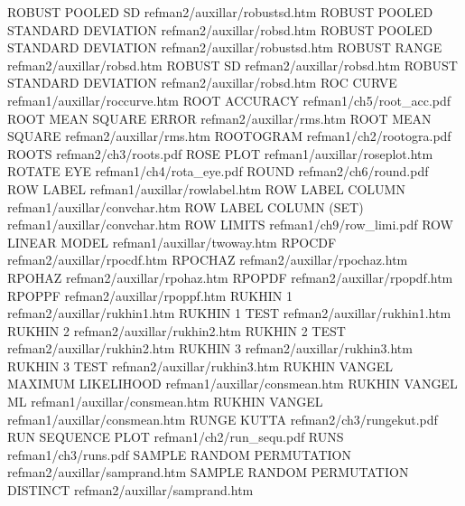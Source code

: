 ROBUST POOLED SD                        refman2/auxillar/robustsd.htm
ROBUST POOLED STANDARD DEVIATION        refman2/auxillar/robsd.htm
ROBUST POOLED STANDARD DEVIATION        refman2/auxillar/robustsd.htm
ROBUST RANGE                            refman2/auxillar/robsd.htm
ROBUST SD                               refman2/auxillar/robsd.htm
ROBUST STANDARD DEVIATION               refman2/auxillar/robsd.htm
ROC CURVE                               refman1/auxillar/roccurve.htm
ROOT ACCURACY                           refman1/ch5/root_acc.pdf
ROOT MEAN SQUARE ERROR                  refman2/auxillar/rms.htm
ROOT MEAN SQUARE                        refman2/auxillar/rms.htm
ROOTOGRAM                               refman1/ch2/rootogra.pdf
ROOTS                                   refman2/ch3/roots.pdf
ROSE PLOT                               refman1/auxillar/roseplot.htm
ROTATE EYE                              refman1/ch4/rota_eye.pdf
ROUND                                   refman2/ch6/round.pdf
ROW LABEL                               refman1/auxillar/rowlabel.htm
ROW LABEL COLUMN                        refman1/auxillar/convchar.htm
ROW LABEL COLUMN (SET)                  refman1/auxillar/convchar.htm
ROW LIMITS                              refman1/ch9/row_limi.pdf
ROW LINEAR MODEL                        refman1/auxillar/twoway.htm
RPOCDF                                  refman2/auxillar/rpocdf.htm
RPOCHAZ                                 refman2/auxillar/rpochaz.htm
RPOHAZ                                  refman2/auxillar/rpohaz.htm
RPOPDF                                  refman2/auxillar/rpopdf.htm
RPOPPF                                  refman2/auxillar/rpoppf.htm
RUKHIN 1                                refman2/auxillar/rukhin1.htm
RUKHIN 1 TEST                           refman2/auxillar/rukhin1.htm
RUKHIN 2                                refman2/auxillar/rukhin2.htm
RUKHIN 2 TEST                           refman2/auxillar/rukhin2.htm
RUKHIN 3                                refman2/auxillar/rukhin3.htm
RUKHIN 3 TEST                           refman2/auxillar/rukhin3.htm
RUKHIN VANGEL MAXIMUM LIKELIHOOD        refman1/auxillar/consmean.htm
RUKHIN VANGEL ML                        refman1/auxillar/consmean.htm
RUKHIN VANGEL                           refman1/auxillar/consmean.htm
RUNGE KUTTA                             refman2/ch3/rungekut.pdf
RUN SEQUENCE PLOT                       refman1/ch2/run_sequ.pdf
RUNS                                    refman1/ch3/runs.pdf
SAMPLE RANDOM PERMUTATION               refman2/auxillar/samprand.htm
SAMPLE RANDOM PERMUTATION DISTINCT      refman2/auxillar/samprand.htm
